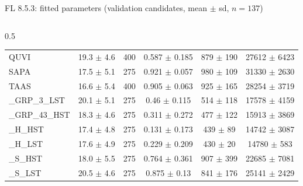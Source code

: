 \begin{frame}{FL 8.5.3: fitted parameters (validation candidates, mean $\pm$ sd, $n{=}137$)}
\begin{columns}[T]
\begin{column}{0.5\textwidth}
{\begin{tabular}{lcrccc}
QUVI           & 19.3 $\pm$ 4.6 & 400 & 0.587 $\pm$ 0.185 & 879 $\pm$ 190  & 27612 $\pm$ 6423 \\
SAPA           & 17.5 $\pm$ 5.1 & 275 & 0.921 $\pm$ 0.057 & 980 $\pm$ 109  & 31330 $\pm$ 2630 \\
TAAS           & 16.6 $\pm$ 5.4 & 400 & 0.905 $\pm$ 0.063 & 925 $\pm$ 165  & 28254 $\pm$ 3719 \\
\_GRP\_3\_LST  & 20.1 $\pm$ 5.1 & 275 & 0.46 $\pm$ 0.115  & 514 $\pm$ 118  & 17578 $\pm$ 4159 \\
\_GRP\_43\_HST & 18.3 $\pm$ 4.6 & 275 & 0.311 $\pm$ 0.272 & 477 $\pm$ 122  & 15913 $\pm$ 3869 \\
\_H\_HST       & 17.4 $\pm$ 4.8 & 275 & 0.131 $\pm$ 0.173 & 439 $\pm$ 89   & 14742 $\pm$ 3087 \\
\_H\_LST       & 17.6 $\pm$ 4.9 & 275 & 0.229 $\pm$ 0.209 & 430 $\pm$ 20   & 14780 $\pm$ 583  \\
\_S\_HST       & 18.0 $\pm$ 5.5 & 275 & 0.764 $\pm$ 0.361 & 907 $\pm$ 399  & 22685 $\pm$ 7081 \\
\_S\_LST       & 20.5 $\pm$ 4.6 & 275 & 0.875 $\pm$ 0.13  & 841 $\pm$ 176  & 25141 $\pm$ 2429 \\
\bottomrule
\end{tabular}}
\end{column}
\end{columns}
\vspace{0.5em}
\end{frame}
